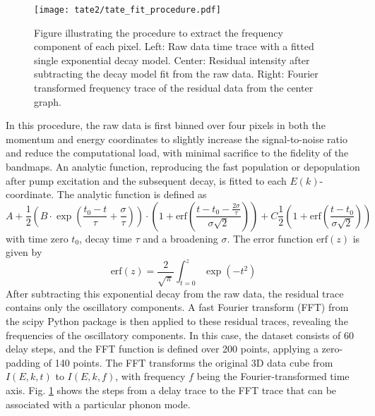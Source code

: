 \begin{figure}[t]
	\centering
	\texttt{[image: tate2/tate\_fit\_procedure.pdf]}
	\caption{Figure illustrating the procedure to extract the frequency component of each pixel. Left: Raw data time trace with a fitted single exponential decay model. Center: Residual intensity after subtracting the decay model fit from the raw data. Right: Fourier transformed frequency trace of the residual data from the center graph.}
	\label{fig:TaTe_fit_procedure}
\end{figure}

In this procedure, the raw data is first binned over four pixels in both the momentum and energy coordinates to slightly increase the signal-to-noise ratio and reduce the computational load, with minimal sacrifice to the fidelity of the bandmaps.
An analytic function, reproducing the fast population or depopulation after pump excitation and the subsequent decay, is fitted to each $E(k)$-coordinate.
The analytic function is defined as
\begin{equation}
	A + \frac{1}{2} \left( B \cdot \exp\left(\frac{t_0-t}{\tau} + \frac{\sigma}{\tau}\right) \right) \cdot \left( 1 + \text{erf}\left(\frac{t-t_0-\frac{2\sigma}{\tau}}{\sigma\sqrt{2}}\right) \right) + C \frac{1}{2} \left( 1 + \text{erf}\left(\frac{t-t_0}{\sigma\sqrt{2}}\right) \right)
	\label{eq:decay_model}
\end{equation}
with time zero $t_0$, decay time $\tau$ and a broadening $\sigma$.
The error function $\text{erf}(z)$ is given by
\begin{equation}
	\text{erf}(z) = \frac{2}{\sqrt{\pi}} \int_{t=0}^{z} \exp(-t^2)
\end{equation}
After subtracting this exponential decay from the raw data, the residual trace contains only the oscillatory components.
A fast Fourier transform (FFT) from the scipy Python package \cite{noauthor_rfft_nodate} is then applied to these residual traces, revealing the frequencies of the oscillatory components.
In this case, the dataset consists of 60 delay steps, and the FFT function is defined over 200 points, applying a zero-padding of 140 points.
The FFT transforms the original 3D data cube from $I(E,k,t)$ to $I(E,k,f)$, with frequency $f$ being the Fourier-transformed time axis.
Fig. \ref{fig:TaTe_fit_procedure} shows the steps from a delay trace to the FFT trace that can be associated with a particular phonon mode.

